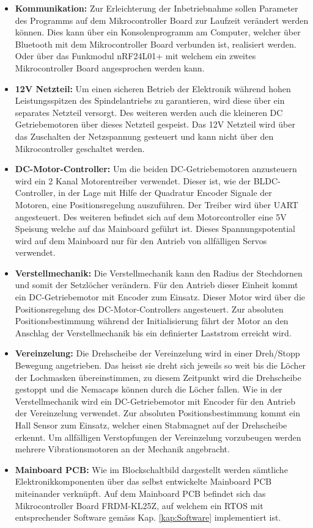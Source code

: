 \begin{itemize}
	\item \textbf{Kommunikation:} Zur Erleichterung der Inbetriebnahme sollen Parameter des Programms auf dem Mikrocontroller Board zur Laufzeit verändert werden können. Dies kann über ein Konsolenprogramm am Computer, welcher über Bluetooth mit dem Mikrocontroller Board verbunden ist, realisiert werden. Oder über das Funkmodul nRF24L01+ mit welchem ein zweites Mikrocontroller Board angesprochen werden kann.
			
	\item \textbf{12V Netzteil:} Um einen sicheren Betrieb der Elektronik während hohen Leistungsspitzen des Spindelantriebs zu garantieren, wird diese über ein separates Netzteil versorgt. Des weiteren werden auch die kleineren DC Getriebemotoren über dieses Netzteil gespeist. Das 12V Netzteil wird über das Zuschalten der Netzspannung gesteuert und kann nicht über den Mikrocontroller geschaltet werden.
	
	\item \textbf{DC-Motor-Controller:} Um die beiden DC-Getriebemotoren anzusteuern wird ein 2 Kanal Motorentreiber verwendet. Dieser ist, wie der BLDC-Controller, in der Lage mit Hilfe der Quadratur Encoder Signale der Motoren, eine Positionsregelung auszuführen. Der Treiber wird über UART angesteuert. Des weiteren befindet sich auf dem Motorcontroller eine 5V Speisung welche auf das Mainboard geführt ist. Dieses Spannungspotential wird auf dem Mainboard nur für den Antrieb von allfälligen Servos verwendet.
	
	\item \textbf{Verstellmechanik:} Die Verstellmechanik kann den Radius der Stechdornen und somit der Setzlöcher verändern. Für den Antrieb dieser Einheit kommt ein DC-Getriebemotor mit Encoder zum Einsatz. Dieser Motor wird über die Positionsregelung des DC-Motor-Controllers angesteuert. Zur absoluten Positionsbestimmung während der Initialisierung fährt der Motor an den Anschlag der Verstellmechanik bis ein definierter Laststrom erreicht wird.
	
	\item \textbf{Vereinzelung:} Die Drehscheibe der Vereinzelung wird in einer Dreh/Stopp Bewegung angetrieben. Das heisst sie dreht sich jeweils so weit bis die Löcher der Lochmasken übereinstimmen, zu diesem Zeitpunkt wird die Drehscheibe gestoppt und die Nemacaps können durch die Löcher fallen. Wie in der Verstellmechanik wird ein DC-Getriebemotor mit Encoder für den Antrieb der Vereinzelung verwendet. Zur absoluten Positionsbestimmung kommt ein Hall Sensor zum Einsatz, welcher einen Stabmagnet auf der Drehscheibe erkennt. Um allfälligen Verstopfungen der Vereinzelung vorzubeugen werden mehrere Vibrationsmotoren an der Mechanik angebracht.
	
	\item \textbf{Mainboard PCB:} Wie im Blockschaltbild dargestellt werden sämtliche Elektronikkomponenten über das selbst entwickelte Mainboard PCB miteinander verknüpft. Auf dem Mainboard PCB befindet sich das Mikrocontroller Board FRDM-KL25Z, auf welchem ein RTOS mit entsprechender Software gemäss Kap. \ref{kap:Software} implementiert ist.
\end{itemize}